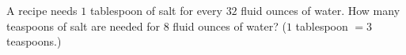 A recipe needs $1$ tablespoon of salt for every $32$ fluid ounces of water. How many teaspoons of salt are needed for $8$ fluid ounces of water? ($1$ tablespoon $=3$ teaspoons.)
